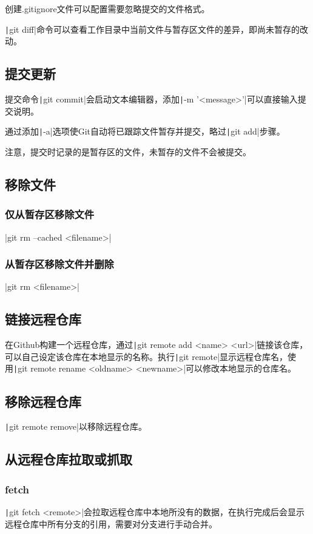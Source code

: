 \documentclass[fontset=ubuntu]{ctexart}
\begin{document}
创建.gitignore文件可以配置需要忽略提交的文件格式。

\texttt|git diff|命令可以查看工作目录中当前文件与暂存区文件的差异，即尚未暂存的改动。

\subsection{提交更新}
提交命令\texttt|git commit|会启动文本编辑器，添加\texttt|-m '<message>'|可以直接输入提交说明。

通过添加\texttt|-a|选项使Git自动将已跟踪文件暂存并提交，略过\texttt|git add|步骤。

注意，提交时记录的是暂存区的文件，未暂存的文件不会被提交。

\subsection{移除文件}
\subsubsection{仅从暂存区移除文件}
|git rm --cached <filename>|

\subsubsection{从暂存区移除文件并删除}
|git rm <filename>|

\subsection{链接远程仓库}
在Github构建一个远程仓库，通过\texttt|git remote add <name> <url>|链接该仓库，可以自己设定该仓库在本地显示的名称。执行\texttt|git remote|显示远程仓库名，使用\texttt|git remote rename <oldname> <newname>|可以修改本地显示的仓库名。

\subsection{移除远程仓库}
\texttt|git remote remove|以移除远程仓库。

\subsection{从远程仓库拉取或抓取}
\subsubsection{fetch}
\texttt|git fetch <remote>|会拉取远程仓库中本地所没有的数据，在执行完成后会显示远程仓库中所有分支的引用，需要对分支进行手动合并。
\end{document}
